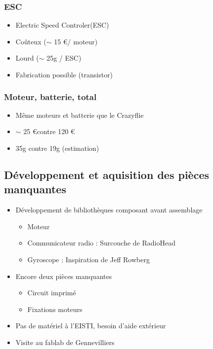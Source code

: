 \documentclass{beamer}
\begin{document}
{	\begin{frame} %
	  \frametitle{ESC}
	
	  \begin{itemize}
	    \item Electric Speed Controler(ESC)
	    \item Coûteux ($\sim$ 15 \euro / moteur)
	    \item Lourd ($\sim$ 25g / ESC)
	    \item Fabrication possible (transistor)
	  \end{itemize}
	\end{frame}
	
	\begin{frame} %
	  \frametitle{Moteur, batterie, total}
	
	  \begin{itemize}
	    \item Même moteurs et batterie que le Crazyflie
	    \item $\sim$ 25 \euro \space contre 120 \euro
	    \item 35g contre 19g (estimation)
	  \end{itemize}
	\end{frame}

      \subsection{Développement et aquisition des pièces manquantes}
	\begin{frame} %
	  \begin{itemize}
	    \item Développement de bibliothèques composant avant assemblage
	    \begin{itemize}
	      \item Moteur
	      \item Communicateur radio : Surcouche de RadioHead
	      \item Gyroscope : Inspiration de Jeff Rowberg 
	    \end{itemize}
	  \end{itemize}
	\end{frame}
	
	\begin{frame} %
	  \begin{itemize}
	    \item Encore deux pièces manquantes
	    \begin{itemize}
	      \item Circuit imprimé
	      \item Fixations moteurs
	    \end{itemize}
	    \item Pas de matériel à l'EISTI, besoin d'aide extérieur
	    \item Visite au fablab de Gennevilliers
	  \end{itemize}
	\end{frame}

}
\end{document}
